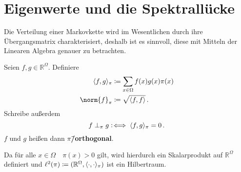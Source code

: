\documentclass[ngerman,a4paper,11pt]{scrartcl}
\newcommand\coloniff{\vcentcolon\!\iff}
\newcommand{\RR}{\mathbb{R}}
\DeclarePairedDelimiter{\sprod}{\langle}{\rangle}	%
\begin{document}
\section{Eigenwerte und die Spektrallücke}
Die Verteilung einer Markovkette wird im Wesentlichen durch ihre Übergangsmatrix
charakterisiert, deshalb ist es sinnvoll, diese mit Mitteln der Linearen
Algebra genauer zu betrachten.

\begin{defn}
  Seien $f, g\in\RR^\Omega$. Definiere
  \begin{align*}
    \sprod{f,g}_\pi&\coloneqq\sum_{x\in\Omega}f(x)g(x)\pi(x) \\
    \norm{f}_\pi&\coloneqq\sqrt{\sprod{f,f}} \, .
  \end{align*}
 Schreibe außerdem
 \begin{equation*}
  f\perp_\pi g\coloniff\sprod{f,g}_\pi=0\, .
 \end{equation*}
 $f$ und $g$ heißen dann \textbf{$\pi$\=/orthogonal}.
\end{defn}

\begin{rem}
 Da für alle $x\in\Omega\quad\pi(x)>0$ gilt, wird hierdurch ein Skalarprodukt auf
 $\RR^\Omega$ definiert und $\ell^2(\pi)\coloneqq(\RR^\Omega,
 \sprod{\cdot,\cdot}_\pi)$ ist ein Hilbertraum.
\end{rem}
\end{document}
